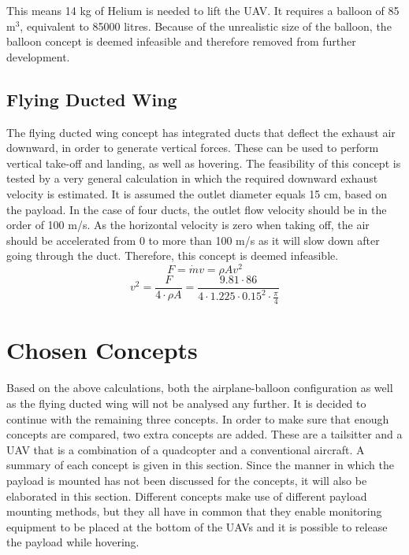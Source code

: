 

This means 14 kg of Helium is needed to lift the UAV. It requires a balloon of 85 m$^3$, equivalent to 85000 litres. Because of the unrealistic size of the balloon, the balloon concept is deemed infeasible and therefore removed from further development.

\subsection{Flying Ducted Wing}
The flying ducted wing concept has integrated ducts that deflect the exhaust air downward, in order to generate vertical forces. These can be used to perform vertical take-off and landing, as well as hovering. The feasibility of this concept is tested by a very general calculation in which the required downward exhaust velocity is estimated. It is assumed the outlet diameter equals 15 cm, based on the payload. In the case of four ducts, the outlet flow velocity should be in the order of 100 m/s. As the horizontal velocity is zero when taking off, the air should be accelerated from 0 to more than 100 m/s as it will slow down after going through the duct. Therefore, this concept is deemed infeasible.
$$F = \dot{m} v = \rho A v^2 $$
$$v^2 = \frac{F}{4 \cdot \rho A} = \frac{9.81 \cdot 86}{4 \cdot 1.225 \cdot 0.15^2 \cdot \frac{\pi}{4}}$$


\section{Chosen Concepts}
\label{sec:chosconc}

Based on the above calculations, both the airplane-balloon configuration as well as the flying ducted wing will not be analysed any further. It is decided to continue with the remaining three concepts. In order to make sure that enough concepts are compared, two extra concepts are added. These are a tailsitter and a UAV that is a combination of a quadcopter and a conventional aircraft. A summary of each concept is given in this section. Since the manner in which the payload is mounted has not been discussed for the concepts, it will also be elaborated in this section. Different concepts make use of different payload mounting methods, but they all have in common that they enable monitoring equipment to be placed at the bottom of the UAVs and it is possible to release the payload while hovering. 

